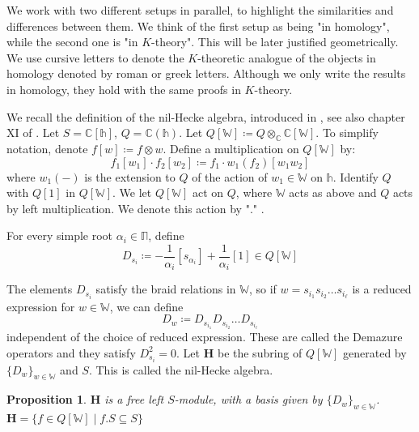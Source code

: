 \documentclass[11pt]{article}
\newcommand{\C}{\mathbb{C}}
\renewcommand{\H}{\textbf{H}}
\newcommand{\1}{\mathbb{1}}
\newcommand{\bbh}{\mathbb{h}}
\newcommand{\tW}{\mathbb{W}}
\renewcommand{\subset}{\subseteq}
\newtheorem{proposition}[theorem]{Proposition}
\theoremstyle{definition}
\numberwithin{equation}{section}
\begin{document}
We work with two different setups in parallel, to highlight the similarities and differences between them. We think of the first setup as being "in homology", while the second one is "in $K$-theory". This will be later justified geometrically. We use cursive letters to denote the $K$-theoretic analogue of the objects in homology denoted by roman or greek letters. Although we only write the results in homology, they hold with the same proofs in $K$-theory.

We recall the definition of the nil-Hecke algebra, introduced in \cite{KK1}, see also chapter XI of \cite{Ku}. Let $S = \C[\bbh]$, $Q=\C(\bbh)$. Let $Q[\tW] \coloneqq Q \otimes_\C \C[\tW]$. To simplify notation, denote $f[w] \coloneqq f\otimes w$. Define a multiplication on $Q[\tW]$ by:
$$f_1 [w_1]\cdot f_2 [w_2] \coloneqq f_1 \cdot w_1(f_2) [w_1 w_2]$$
\noindent where $w_1(-)$ is the extension to $Q$ of the action of $w_1 \in \tW$ on $\bbh$. Identify $Q$ with $Q[1]$ in $Q[\tW]$. We let $Q[\tW]$ act on $Q$, where $\tW$ acts as above and $Q$ acts by left multiplication. We denote this action by "." .

For every simple root $\alpha_i \in \mathbb{\Pi}$, define
$$D_{s_i} \coloneqq -\frac{1}{\alpha_i} [s_{\alpha_i}] + \frac{1}{\alpha_i} [1] \in Q[\tW]$$

The elements $D_{s_i}$ satisfy the braid relations in $\tW$, so if $w = s_{i_1} s_{i_2} \ldots s_{i_\ell}$ is a reduced expression for $w\in \tW$, we can define 
$$D_w \coloneqq D_{s_{i_1}} D_{s_{i_2}} \ldots D_{s_{i_\ell}}$$
\noindent independent of the choice of reduced expression. These are called the Demazure operators and they satisfy $D_{s_i}^2=0$. Let $\H$ be the subring of $Q[\tW]$ generated by $\{D_w\}_{w\in \tW}$ and $S$. This is called the nil-Hecke algebra.

\begin{proposition}
\label{tH_description}
    $\H$ is a free left $S$-module, with a basis given by $\{D_w\}_{w\in \tW}$.\\
    $\H = \{ f\in Q[\tW] \mid f.S \subset S \}$    
\end{proposition}
\end{document}
